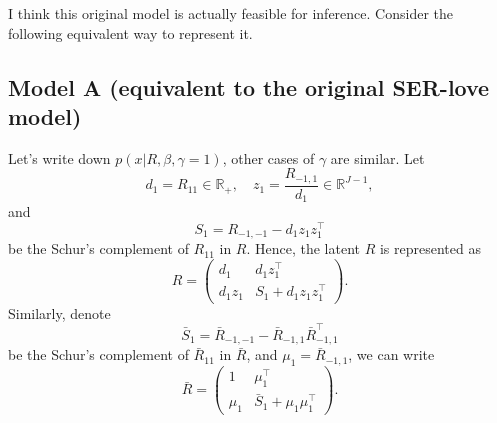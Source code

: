 \documentclass[11pt]{article}
\begin{document}
I think this original model is actually feasible for inference. Consider the following equivalent way to represent it.

\subsection{Model A (equivalent to the original SER-love model)} Let's write down $p(x | R, \beta, \gamma = 1)$, other cases of $\gamma$ are similar. Let 
$$d_1 = R_{11} \in \mathbb{R}_{+}, \quad z_1 = \dfrac{R_{-1, 1}}{d_1} \in \mathbb{R}^{J-1},$$
and 
$$S_1 = R_{-1, -1} - d_1 z_1 z_1^\top $$
be the Schur's complement of $R_{11}$ in $R$. Hence, the latent $R$ is represented as
\begin{equation}\label{eq:R-block}
R = \begin{pmatrix}
d_1 & d_1 z_1^\top \\
d_1 z_1 & S_1 + d_1 z_1 z_1^\top
\end{pmatrix}.
\end{equation}
Similarly, denote
$$\bar S_1 = \bar R_{-1, -1} - \bar R_{-1, 1} \bar R_{-1, 1}^\top $$
be the Schur's complement of $\bar R_{11}$ in $\bar R$, and $\mu_1 =  \bar R_{-1, 1}$, we can write
\begin{equation}\label{eq:R-bar-block}
\bar R = \begin{pmatrix}
1 &\mu_1^\top \\
\mu_1 & \bar S_1 + \mu_1 \mu_1^\top
\end{pmatrix}.
\end{equation}
\end{document}
